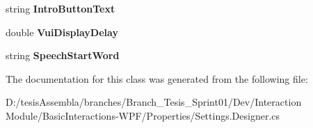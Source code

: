 \begin{DoxyCompactItemize}
\item 
\hypertarget{class_microsoft_1_1_samples_1_1_kinect_1_1_basic_interactions_1_1_properties_1_1_settings_a3c031c059b5db2dca7a929b8ec6ec3df}{string {\bfseries Intro\-Button\-Text}}\label{class_microsoft_1_1_samples_1_1_kinect_1_1_basic_interactions_1_1_properties_1_1_settings_a3c031c059b5db2dca7a929b8ec6ec3df}

\item 
\hypertarget{class_microsoft_1_1_samples_1_1_kinect_1_1_basic_interactions_1_1_properties_1_1_settings_acbc2536487ff5b60643a9377bf48b128}{double {\bfseries Vui\-Display\-Delay}}\label{class_microsoft_1_1_samples_1_1_kinect_1_1_basic_interactions_1_1_properties_1_1_settings_acbc2536487ff5b60643a9377bf48b128}

\item 
\hypertarget{class_microsoft_1_1_samples_1_1_kinect_1_1_basic_interactions_1_1_properties_1_1_settings_a6907636a83b8780e1b4739954cf45b42}{string {\bfseries Speech\-Start\-Word}}\label{class_microsoft_1_1_samples_1_1_kinect_1_1_basic_interactions_1_1_properties_1_1_settings_a6907636a83b8780e1b4739954cf45b42}

\end{DoxyCompactItemize}


The documentation for this class was generated from the following file\-:\begin{DoxyCompactItemize}
\item 
D\-:/tesis\-Assembla/branches/\-Branch\-\_\-\-Tesis\-\_\-\-Sprint01/\-Dev/\-Interaction Module/\-Basic\-Interactions-\/\-W\-P\-F/\-Properties/Settings.\-Designer.\-cs\end{DoxyCompactItemize}
